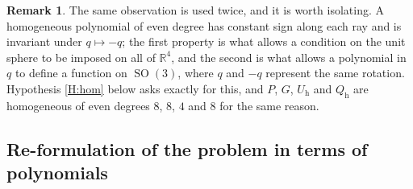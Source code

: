 \documentclass[reqno]{amsart}
\theoremstyle{definition}
\newtheorem{remark}[theorem]{Remark}
\DeclareMathOperator{\SO}{SO}
\newcommand{\R}{\mathbb{R}}
\begin{document}
\begin{remark}\label{rem:homogTwice}
The same observation is used twice, and it is worth isolating. A homogeneous polynomial of even
degree has constant sign along each ray and is invariant under $q\mapsto-q$; the first property is
what allows a condition on the unit sphere to be imposed on all of $\R^4$, and the second is what
allows a polynomial in $q$ to define a function on $\SO(3)$, where $q$ and $-q$ represent the same
rotation. Hypothesis \ref{H:hom} below asks exactly for this, and $P$, $G$, $U_{\mathrm h}$ and
$Q_{\mathrm h}$ are homogeneous of even degrees $8$, $8$, $4$ and $8$ for the same reason.
\end{remark}



\subsection{Re-formulation of the problem in terms of polynomials}\label{subsec:ReFormulationPolynomials}
\end{document}

